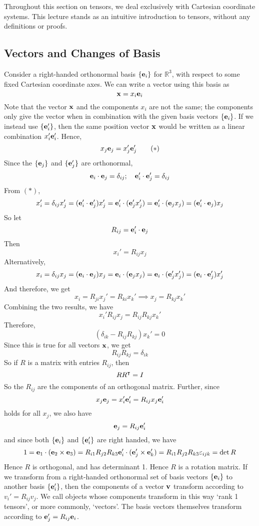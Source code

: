 Throughout this section on tensors, we deal exclusively with Cartesian coordinate systems. This lecture stands as an intuitive introduction to tensors, without any definitions or proofs.
\subsection{Vectors and Changes of Basis}
Consider a right-handed orthonormal basis $\{ \vb e_i \}$ for $\mathbb R^3$, with respect to some fixed Cartesian coordinate axes. We can write a vector using this basis as
\[ \vb x = x_i \vb e_i \]
Note that the vector $\vb x$ and the components $x_i$ are not the same; the components only give the vector when in combination with the given basis vectors $\{ \vb e_i \}$. If we instead use $\{ \vb e'_i \}$, then the same position vector $\vb x$ would be written as a linear combination $x'_i \vb e'_i$. Hence,
\begin{equation}
	x_j \vb e_j = x'_j \vb e'_j
	\tag{$\ast$}
\end{equation}
Since the $\{ \vb e_j \}$ and $\{ \vb e'_j \}$ are orthonormal,
\[ \vb e_i \cdot \vb e_j = \delta_{ij};\quad \vb e'_i \cdot \vb e'_j = \delta_{ij} \]
From $(\ast)$,
\[ x_i' = \delta_{ij} x_j' = (\vb e_i' \cdot \vb e_j') x_j' = \vb e_i' \cdot (\vb e_j' x_j') = \vb e_i' \cdot (\vb e_j x_j) = (\vb e_i' \cdot \vb e_j) x_j \]
So let
\[ R_{ij} = \vb e_i' \cdot \vb e_j \]
Then
\[ x_i' = R_{ij} x_j \]
Alternatively,
\[ x_i = \delta_{ij} x_j = (\vb e_i \cdot \vb e_j) x_j = \vb e_i \cdot (\vb e_j x_j) = \vb e_i \cdot (\vb e_j' x_j') = (\vb e_i \cdot \vb e_j') x_j' \]
And therefore, we get
\[ x_i = R_{ji} x_j' = R_{ki} x_k' \implies x_j = R_{kj} x_k' \]
Combining the two results, we have
\[ x_i' R_{ij} x_j = R_{ij} R_{kj} x_k' \]
Therefore,
\[ (\delta_{ik} - R_{ij}R_{kj}) x_k' = 0 \]
Since this is true for all vectors $\vb x$, we get
\[ R_{ij}R_{kj} = \delta_{ik} \]
So if $R$ is a matrix with entries $R_{ij}$, then
\[ R R^\intercal = I \]
So the $R_{ij}$ are the components of an orthogonal matrix. Further, since
\[ x_j \vb e_j = x_i' \vb e_i' = R_{ij} x_j \vb e_i' \]
holds for all $x_j$, we also have
\[ \vb e_j = R_{ij} \vb e_i' \]
and since both $\{ \vb e_i \}$ and $\{ \vb e_i' \}$ are right handed, we have
\[ 1 = \vb e_1 \cdot (\vb e_2 \times \vb e_3) = R_{i1} R_{j2} R_{k3} \vb e_i' \cdot (\vb e_j' \times \vb e_k') = R_{i1} R_{j2} R_{k3} \varepsilon_{ijk} = \det R \]
Hence $R$ is orthogonal, and has determinant 1. Hence $R$ is a rotation matrix. If we transform from a right-handed orthonormal set of basis vectors $\{ \vb e_i \}$ to another basis $\{ \vb e_i' \}$, then the components of a vector $\vb v$ transform according to $v_i' = R_{ij} v_j$. We call objects whose components transform in this way `rank 1 tensors', or more commonly, `vectors'. The basis vectors themselves transform according to $\vb e_j' = R_{ij} \vb e_i$.

